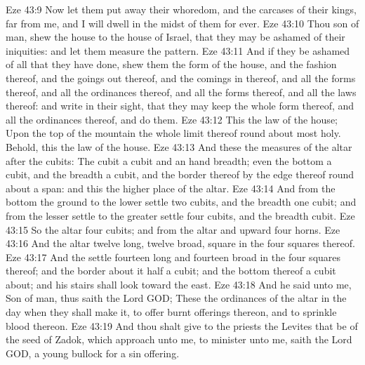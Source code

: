 \vs Eze 43:9 Now let them put away their whoredom, and the carcases of their kings, far from me, and I will dwell in the midst of them for ever.
\vs Eze 43:10 Thou son of man, shew the house to the house of Israel, that they may be ashamed of their iniquities: and let them measure the pattern.
\vs Eze 43:11 And if they be ashamed of all that they have done, shew them the form of the house, and the fashion thereof, and the goings out thereof, and the comings in thereof, and all the forms thereof, and all the ordinances thereof, and all the forms thereof, and all the laws thereof: and write  in their sight, that they may keep the whole form thereof, and all the ordinances thereof, and do them.
\vs Eze 43:12 This  the law of the house; Upon the top of the mountain the whole limit thereof round about  most holy. Behold, this  the law of the house.
\vs Eze 43:13 And these  the measures of the altar after the cubits: The cubit  a cubit and an hand breadth; even the bottom  a cubit, and the breadth a cubit, and the border thereof by the edge thereof round about  a span: and this  the higher place of the altar.
\vs Eze 43:14 And from the bottom  the ground  to the lower settle  two cubits, and the breadth one cubit; and from the lesser settle  to the greater settle  four cubits, and the breadth  cubit.
\vs Eze 43:15 So the altar  four cubits; and from the altar and upward  four horns.
\vs Eze 43:16 And the altar  twelve  long, twelve broad, square in the four squares thereof.
\vs Eze 43:17 And the settle  fourteen  long and fourteen broad in the four squares thereof; and the border about it  half a cubit; and the bottom thereof  a cubit about; and his stairs shall look toward the east.
\vs Eze 43:18 And he said unto me, Son of man, thus saith the Lord GOD; These  the ordinances of the altar in the day when they shall make it, to offer burnt offerings thereon, and to sprinkle blood thereon.
\vs Eze 43:19 And thou shalt give to the priests the Levites that be of the seed of Zadok, which approach unto me, to minister unto me, saith the Lord GOD, a young bullock for a sin offering.
